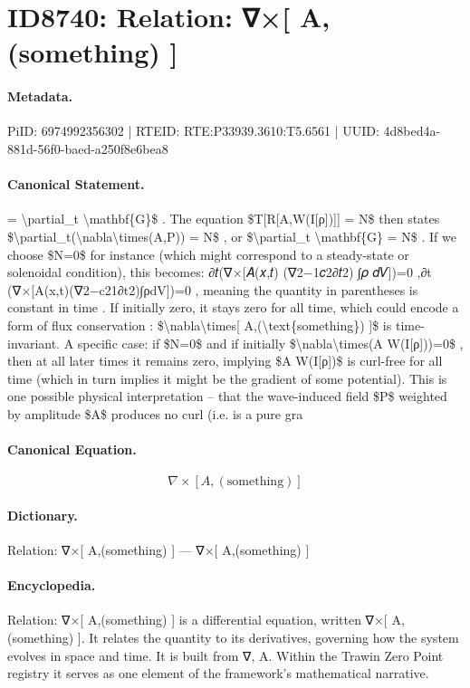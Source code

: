 \section*{ID8740: Relation: ∇×[ A,(something) ]}
\paragraph{Metadata.}
PiID: 6974992356302 | RTEID: RTE:P33939.3610:T5.6561 | UUID: 4d8bed4a-881d-56f0-baed-a250f8e6bea8

\paragraph{Canonical Statement.}
= \textbackslash{}partial\_t \textbackslash{}mathbf\{G\}\$ . The equation \$T[R[A,W(I[ρ])]] = N\$ then states \$\textbackslash{}partial\_t(\textbackslash{}nabla\textbackslash{}times(A,P)) = N\$ , or \$\textbackslash{}partial\_t \textbackslash{}mathbf\{G\} = N\$ . If we choose \$N=0\$ for instance (which might correspond to a steady-state or solenoidal condition), this becomes: ∂𝑡(∇×[𝐴(𝑥,𝑡) (∇2−1𝑐2∂𝑡2) ⁣∫𝜌 𝑑𝑉])=0 ,∂t​(∇×[A(x,t)(∇2−c21​∂t2​)∫ρdV])=0 , meaning the quantity in parentheses is constant in time . If initially zero, it stays zero for all time, which could encode a form of flux conservation : \$\textbackslash{}nabla\textbackslash{}times[ A,(\textbackslash{}text\{something\}) ]\$ is time-invariant. A specific case: if \$N=0\$ and if initially \$\textbackslash{}nabla\textbackslash{}times(A W(I[ρ]))=0\$ , then at all later times it remains zero, implying \$A W(I[ρ])\$ is curl-free for all time (which in turn implies it might be the gradient of some potential). This is one possible physical interpretation – that the wave-induced field \$P\$ weighted by amplitude \$A\$ produces no curl (i.e. is a pure gra

\paragraph{Canonical Equation.}
\[
\nabla\times[ A,(\text{something}) ]
\]

\paragraph{Dictionary.}
Relation: ∇×[ A,(something) ] — ∇×[ A,(something) ]

\paragraph{Encyclopedia.}
Relation: ∇×[ A,(something) ] is a differential equation, written ∇×[ A,(something) ]. It relates the quantity to its derivatives, governing how the system evolves in space and time. It is built from ∇, A. Within the Trawin Zero Point registry it serves as one element of the framework's mathematical narrative.
